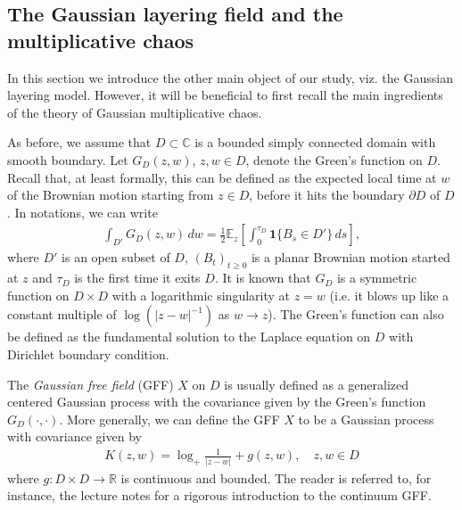 \documentclass[a4paper, 11pt, reqno]{amsart}
\theoremstyle{definition} \newtheorem{defn}{Definition}[section]
\theoremstyle{remark} \newtheorem{rem}[defn]{Remark}
\theoremstyle{remark} \newtheorem*{rem*}{Remark}
\theoremstyle{plain} \newtheorem{thm}[defn]{Theorem}
\theoremstyle{plain} \newtheorem{lem}[defn]{Lemma}
\theoremstyle{plain} \newtheorem{prop}[defn]{Proposition}
\theoremstyle{plain} \newtheorem{cor}[defn]{Corollary}
\theoremstyle{remark} \newtheorem{exm}[defn]{\textbf{Example}}
\theoremstyle{remark} \newtheorem{exms}[defn]{\textbf{Examples}}
\theoremstyle{remark} \newtheorem*{bl}{}
\numberwithin{equation}{section} %
\newcommand{\x}{\times}
\newcommand{\C}{\mathbb{C}}
\newcommand{\R}{\mathbb{R}}
\newcommand{\E}{\mathbb{E}}
\newcommand{\ind}{\mathbf{1}}
\newcommand{\clpl}{\color{purple} }
\begin{document}
	\subsection{The Gaussian layering field and the multiplicative chaos}\label{sec:prelim_glf_gmc}
	
	In this section we introduce the other main object of our study, viz. the Gaussian layering model. However, it will be beneficial to first recall the main ingredients of the theory of Gaussian multiplicative chaos. 
 
    As before, we assume that $D\subset \C$ is a bounded simply connected domain with smooth boundary. Let $G_D(z,w)$, $z,w \in D$, denote the Green's function on $D$. Recall that, at least formally, this can be defined as the expected local time at $w$ of the Brownian motion starting from $z \in D$, before it hits the boundary $\partial D$ of $D$. In notations, we can write 
    \begin{align}
        \int_{D'} G_D(z, w) \,dw = \frac{1}{2}\E_z \left[\int_0^{\tau_D} \ind\{B_s \in D'\} \, ds \right],
    \end{align}
    where $D'$ is an open subset of $D$, $(B_t)_{t \ge 0}$ is a planar Brownian motion started at $z$ and $\tau_D$ is the first time it exits $D$. It is known that $G_D$ is a symmetric function on $D\x D$ with a logarithmic singularity at $z=w$ (i.e. it blows up like a constant multiple of $\log (|z-w|^{-1})$ as $w \to z$). The Green's function can also be defined as the fundamental solution to the Laplace equation on $D$ with Dirichlet boundary condition. 
    
    The \textit{Gaussian free field} (GFF) $X$ on $D$ is usually defined as a generalized centered Gaussian process with the covariance given by the Green's function $G_D(\cdot, \cdot)$. More generally, we can define the GFF $X$ to be a Gaussian process with covariance given by 
	\begin{align}\label{eq:gff_cov}
		K(z, w) = \log_+ \frac{1}{|z-w|} + g(z,w), \quad z, w \in D
	\end{align}
	where $g: D\x D \to \R$ is continuous and bounded. The reader is referred to, for instance, the lecture notes \cite[Chapter 3]{wp21} for a rigorous introduction to the continuum GFF.
	
	
\end{document}
